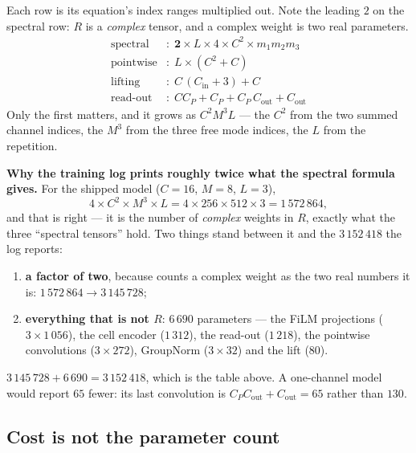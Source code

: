 \noindent
Each row is its equation's index ranges multiplied out. Note the leading
$2$ on the spectral row: $R$ is a \emph{complex} tensor, and a complex weight
is two real parameters.
\begin{align}
  \text{spectral}  &: \; \mathbf{2} \times L \times 4 \times C^2 \times m_1 m_2 m_3 \\
  \text{pointwise} &: \; L \times (C^2 + C) \\
  \text{lifting}   &: \; C\,(C_{\mathrm{in}} + 3) + C \\
  \text{read-out}  &: \; C C_P + C_P + C_P\,C_{\mathrm{out}} + C_{\mathrm{out}}
\end{align}
Only the first matters, and it grows as $C^2 M^3 L$ --- the $C^2$ from the two
summed channel indices, the $M^3$ from the three free mode indices, the $L$
from the repetition.

\begin{pnote}
\textbf{Why the training log prints roughly twice what the spectral formula
gives.} For the shipped model ($C=16$, $M=8$, $L=3$),
\begin{equation*}
  4 \times C^2 \times M^3 \times L
  = 4 \times 256 \times 512 \times 3 = 1\,572\,864,
\end{equation*}
and that is right --- it is the number of \emph{complex} weights in $R$,
exactly what the three ``spectral tensors'' hold. Two things stand between it
and the $3\,152\,418$ the log reports:

\begin{enumerate}
  \item \textbf{a factor of two}, because
     counts a complex weight as the two real
    numbers it is: $1\,572\,864 \to 3\,145\,728$;
  \item \textbf{everything that is not $R$}: $6\,690$ parameters --- the FiLM
    projections ($3\times1\,056$), the cell encoder ($1\,312$), the read-out
    ($1\,218$), the pointwise convolutions ($3\times272$), GroupNorm
    ($3\times32$) and the lift ($80$).
\end{enumerate}

$3\,145\,728 + 6\,690 = 3\,152\,418$, which is the table above. A
one-channel model would report $65$ fewer: its last convolution is
$C_P C_{\mathrm{out}} + C_{\mathrm{out}} = 65$ rather than $130$.
\end{pnote}

\subsection{Cost is not the parameter count}

